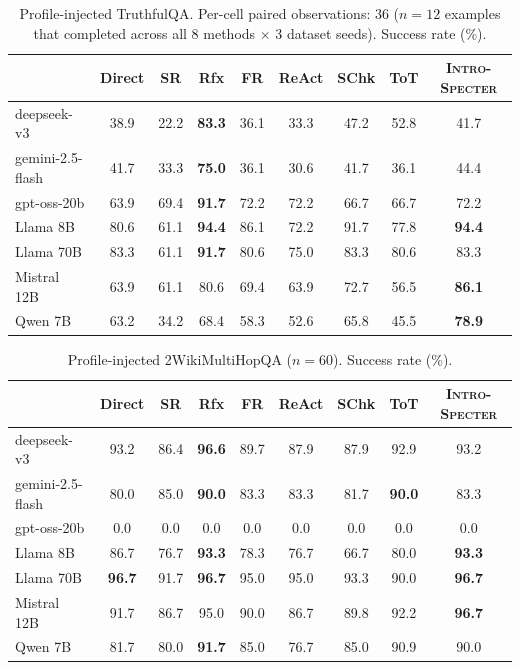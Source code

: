\documentclass{article}
\newcommand{\method}{\textsc{Intro-Specter}\xspace}
\begin{document}
\begin{table}[t]\centering\small
\caption{Profile-injected TruthfulQA. Per-cell paired observations: 36 ($n{=}12$ examples that completed across all 8 methods $\times$ 3 dataset seeds). Success rate (\%).}
\label{tab:truthfulqa-arch}\setlength{\tabcolsep}{3pt}
\begin{tabular}{l cccccccc}\toprule
& Direct & SR & Rfx & FR & ReAct & SChk & ToT & \method \\\midrule
deepseek-v3 & 38.9 & 22.2 & \textbf{83.3} & 36.1 & 33.3 & 47.2 & 52.8 & 41.7 \\
gemini-2.5-flash & 41.7 & 33.3 & \textbf{75.0} & 36.1 & 30.6 & 41.7 & 36.1 & 44.4 \\
gpt-oss-20b & 63.9 & 69.4 & \textbf{91.7} & 72.2 & 72.2 & 66.7 & 66.7 & 72.2 \\
Llama 8B & 80.6 & 61.1 & \textbf{94.4} & 86.1 & 72.2 & 91.7 & 77.8 & \textbf{94.4} \\
Llama 70B & 83.3 & 61.1 & \textbf{91.7} & 80.6 & 75.0 & 83.3 & 80.6 & 83.3 \\
Mistral 12B & 63.9 & 61.1 & 80.6 & 69.4 & 63.9 & 72.7 & 56.5 & \textbf{86.1} \\
Qwen 7B & 63.2 & 34.2 & 68.4 & 58.3 & 52.6 & 65.8 & 45.5 & \textbf{78.9} \\
\bottomrule\end{tabular}\end{table}

\begin{table}[t]\centering\small
\caption{Profile-injected 2WikiMultiHopQA ($n{=}60$). Success rate (\%).}
\label{tab:2wiki-arch}\setlength{\tabcolsep}{3pt}
\begin{tabular}{l cccccccc}\toprule
& Direct & SR & Rfx & FR & ReAct & SChk & ToT & \method \\\midrule
deepseek-v3 & 93.2 & 86.4 & \textbf{96.6} & 89.7 & 87.9 & 87.9 & 92.9 & 93.2 \\
gemini-2.5-flash & 80.0 & 85.0 & \textbf{90.0} & 83.3 & 83.3 & 81.7 & \textbf{90.0} & 83.3 \\
gpt-oss-20b & 0.0 & 0.0 & 0.0 & 0.0 & 0.0 & 0.0 & 0.0 & 0.0 \\
Llama 8B & 86.7 & 76.7 & \textbf{93.3} & 78.3 & 76.7 & 66.7 & 80.0 & \textbf{93.3} \\
Llama 70B & \textbf{96.7} & 91.7 & \textbf{96.7} & 95.0 & 95.0 & 93.3 & 90.0 & \textbf{96.7} \\
Mistral 12B & 91.7 & 86.7 & 95.0 & 90.0 & 86.7 & 89.8 & 92.2 & \textbf{96.7} \\
Qwen 7B & 81.7 & 80.0 & \textbf{91.7} & 85.0 & 76.7 & 85.0 & 90.9 & 90.0 \\
\bottomrule\end{tabular}\end{table}
\end{document}
